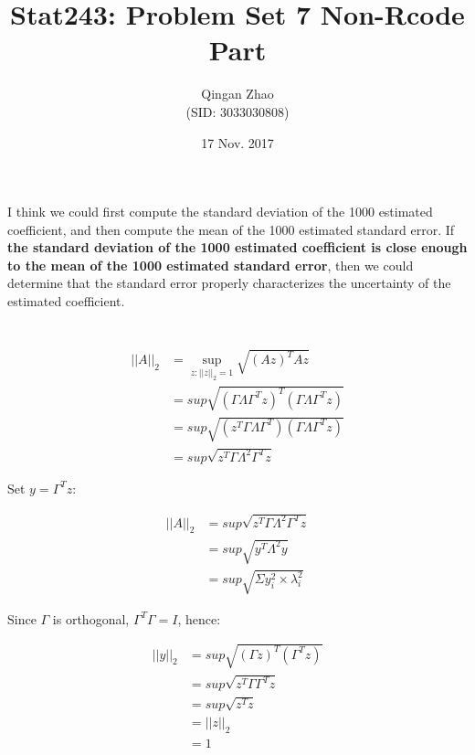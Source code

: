 \documentclass[12pt]{article}
\title{Stat243: Problem Set 7 Non-Rcode Part}
\date{17 Nov. 2017}
\author{Qingan Zhao \\ (SID: 3033030808)}
\begin{document}
\maketitle
\renewcommand\thesection{Problem \arabic{section}}
\renewcommand\thesubsection{(\alph{subsection})}

\section{}

I think we could first compute the standard deviation of the 1000 estimated coefficient, and then compute the mean of the 1000 estimated standard error. If \textbf{the standard deviation of the 1000 estimated coefficient is close enough to the mean of the 1000 estimated standard error}, then we could determine that the standard error properly characterizes the uncertainty of the estimated coefficient.

\section{}

\begin{equation*}
\begin{split}
||A||_2&=\mathop{sup}\limits_{z:||z||_2=1}\sqrt{(Az)^TAz}\\
&=sup\sqrt{(\Gamma\Lambda\Gamma^Tz)^T(\Gamma\Lambda\Gamma^Tz)}\\
&=sup\sqrt{(z^T\Gamma\Lambda\Gamma^T)(\Gamma\Lambda\Gamma^Tz)}\\
&=sup\sqrt{z^T\Gamma\Lambda^2\Gamma^Tz}
\end{split}
\end{equation*}

\noindent Set $y=\Gamma^Tz$:

\begin{equation*}
\begin{split}
||A||_2&=sup\sqrt{z^T\Gamma\Lambda^2\Gamma^Tz}\\
&=sup\sqrt{y^T\Lambda^2y}\\
&=sup\sqrt{\Sigma y_i^2\times\lambda_i^2}
\end{split}
\end{equation*}

\noindent Since $\Gamma$ is orthogonal, $\Gamma^T\Gamma=I$, hence:

\begin{equation*}
\begin{split}
||y||_2&=sup\sqrt{(\Gamma z)^T(\Gamma^Tz)}\\
&=sup\sqrt{z^T\Gamma\Gamma^Tz}\\
&=sup\sqrt{z^Tz}\\
&=||z||_2\\
&=1
\end{split}
\end{equation*}
\end{document}
